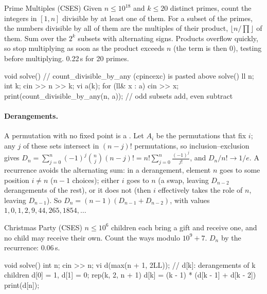 
\begin{problem}{Prime Multiples (CSES)}
Given $n \le 10^{18}$ and $k \le 20$ distinct primes, count the integers in $[1, n]$ divisible by at least one of them.
\solution For a subset of the primes, the numbers divisible by all of them are the multiples of their product, $\lfloor n /
\prod \rfloor$ of them. Sum over the $2^k$ subsets with alternating signs. Products overflow quickly, so stop multiplying as soon as the
product exceeds $n$ (the term is then 0), testing  before multiplying. 0.22\,s for 20 primes.
\end{problem}

\begin{code}
void solve() {  // count_divisible_by_any (cpincexc) is pasted above solve()
    ll n;
    int k;
    cin >> n >> k;
    vi a(k);
    for (ll& x : a) cin >> x;
    print(count_divisible_by_any(n, a));  // odd subsets add, even subtract
}
\end{code}

\paragraph{Derangements.} A permutation with no fixed point is a . Let $A_i$ be the permutations that fix $i$; any $j$
of these sets intersect in $(n - j)!$ permutations, so inclusion--exclusion gives $D_n = \sum_{j=0}^{n} (-1)^j \binom{n}{j} (n-j)! = n!
\sum_{j=0}^{n} \frac{(-1)^j}{j!}$, and $D_n / n! \to 1/e$. A recurrence avoids the alternating sum: in a derangement, element $n$ goes
to some position $i \ne n$ ($n - 1$ choices); either $i$ goes to $n$ (a swap, leaving $D_{n-2}$ derangements of the rest), or it does
not (then $i$ effectively takes the role of $n$, leaving $D_{n-1}$). So $D_n = (n - 1)(D_{n-1} + D_{n-2})$, with values $1, 0, 1, 2, 9,
44, 265, 1854, \dots$

\begin{problem}{Christmas Party (CSES)}
$n \le 10^6$ children each bring a gift and receive one, and no child may receive their own. Count the ways modulo $10^9 + 7$.
\solution $D_n$ by the recurrence: 0.06\,s.
\end{problem}

\begin{code}
void solve() {
    int n;
    cin >> n;
    vi d(max(n + 1, 2LL));  // d[k]: derangements of k children
    d[0] = 1, d[1] = 0;
    rep(k, 2, n + 1) d[k] = (k - 1) * (d[k - 1] + d[k - 2]) %
    print(d[n]);
}
\end{code}

